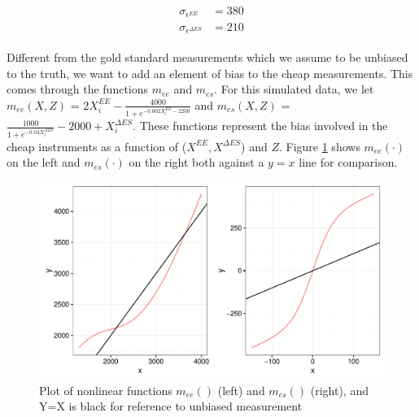 \documentclass[11pt]{article}\usepackage[]{graphicx}\usepackage[]{color}
\makeatletter
\def\maxwidth{ %
  \ifdim\Gin@nat@width>\linewidth
    \linewidth
  \else
    \Gin@nat@width
  \fi
}
\newenvironment{knitrout}{}{} %
\makeatother
\begin{document}
  
\begin{align}
  \begin{split}
   \label{cheapvar}
   \sigma_{\epsilon^{EE}} &= 380 \\
   \sigma_{\epsilon^{\Delta ES}} &= 210
   \end{split}
\end{align}

  Different from the gold standard measurements which we assume to be unbiased to the truth, we want to add an element of bias to the cheap measurements. This comes through the functions $m_{ee}$ and $m_{es}$. For this simulated data, we let $m_{ee}(X,Z)$ = $2X_i^{EE}-\frac{4000}{1+e^{-0.002X_i^{EE}-2200}} $ and $m_{es}(X,Z)$ = $\frac{1000}{1+e^{-0.04X_i^{\Delta ES}}} - 2000 + X_i^{\Delta ES}$. These functions represent the bias involved in the cheap instruments as a function of ($X^{EE},X^{\Delta ES}$) and $Z$. Figure \ref{fig:nonlinear} shows $m_{ee}(\cdot)$ on the left and $m_{es}(\cdot)$ on the right both against a  $y=x$ line for comparison. 


\begin{knitrout}
\color{fgcolor}\begin{figure}

{\centering \includegraphics[width=\maxwidth]{figure/nonlinear-1} 

}

\caption[Plot of nonlinear functions ]{Plot of nonlinear functions $m_{ee}()$ (left) and $m_{es}()$ (right), and Y=X is black for reference to unbiased measurement}\label{fig:nonlinear}
\end{figure}


\end{knitrout}
\end{document}

